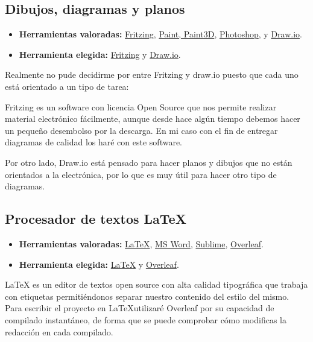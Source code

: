 \subsection{Dibujos, diagramas y planos}\label{4:plataformasDibujosYPlanos}
\begin{itemize}
    \item \textbf{Herramientas valoradas:} \href{https://fritzing.org/}{Fritzing}, \href{https://support.microsoft.com/es-es/windows/obtener-microsoft-paint-a6b9578c-ed1c-5b09-0699-4ed8115f9aa9}{Paint, Paint3D}, \href{https://www.adobe.com/es/products/photoshop.html}{Photoshop}, y \href{www.draw.io}{Draw.io}.
    \item \textbf{Herramienta elegida:} \href{https://fritzing.org/}{Fritzing} y \href{www.draw.io}{Draw.io}.
\end{itemize}
Realmente no pude decidirme por entre Fritzing y draw.io puesto que cada uno está orientado a un tipo de tarea:

Fritzing es un software con licencia Open Source\cite{misc:OpenSource} que nos permite realizar material electrónico fácilmente, aunque desde hace algún tiempo debemos hacer un pequeño desembolso por la descarga. En mi caso con el fin de entregar diagramas de calidad los haré con este software.

Por otro lado, Draw.io está pensado para hacer planos y dibujos que no están orientados a la electrónica, por lo que es muy útil para hacer otro tipo de diagramas.

\subsection{Procesador de textos \LaTeX}\label{4:latex}
\begin{itemize}
    \item \textbf{Herramientas valoradas:} \href{https://www.latex-project.org/}{\LaTeX}, \href{https://www.microsoft.com/es-es/microsoft-365/word}{MS Word}, \href{https://www.sublimetext.com/}{Sublime}, \href{https://www.overleaf.com/}{Overleaf}.
    \item \textbf{Herramienta elegida:} \href{https://www.latex-project.org/}{\LaTeX} y \href{https://www.overleaf.com/}{Overleaf}.
\end{itemize}
\LaTeX{} es un editor de textos open source\cite{misc:OpenSource} con alta calidad tipográfica que trabaja con etiquetas permitiéndonos separar nuestro contenido del estilo del mismo. Para escribir el proyecto en \LaTeX utilizaré Overleaf por su capacidad de compilado instantáneo, de forma que se puede comprobar cómo modificas la redacción en cada compilado.

